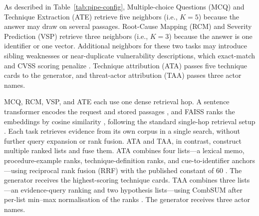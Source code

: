 \documentclass[5p,times,authoryear]{elsarticle}
\begin{document}
As described in Table~\ref{tab:pipe-config}, Multiple-choice Questions (MCQ) and Technique Extraction (ATE) retrieve five neighbors (i.e., $K{=}5$) because the answer may draw on several passages. Root-Cause Mapping (RCM) and Severity Prediction (VSP) retrieve three neighbors (i.e., $K{=}3$) because the answer is one identifier or one vector. Additional neighbors for these two tasks may introduce sibling weaknesses or near-duplicate vulnerability descriptions, which exact-match and CVSS scoring penalize \citep{shi2023distracted}. Technique attribution (ATA) passes five technique cards to the generator, and threat-actor attribution (TAA) passes three actor names.

MCQ, RCM, VSP, and ATE each use one dense retrieval hop. A sentence transformer encodes the request and stored passages \citep{reimers2019sentence}, and FAISS ranks the embeddings by cosine similarity \citep{johnson2019billion}, following the standard single-hop retrieval setup \citep{karpukhin2020dense}. Each task retrieves evidence from its own corpus in a single search, without further query expansion or rank fusion. ATA and TAA, in contrast, construct multiple ranked lists and fuse them. ATA combines four lists—a lexical memo, procedure-example ranks, technique-definition ranks, and cue-to-identifier anchors—using reciprocal rank fusion (RRF) with the published constant of $60$ \citep{cormack2009rrf}. The generator receives the highest-scoring technique cards. TAA combines three lists—an evidence-query ranking and two hypothesis lists—using CombSUM \citep{fox1994combination} after per-list min--max normalisation of the ranks \citep{lee1997ir}. The generator receives three actor names.

\end{document}

